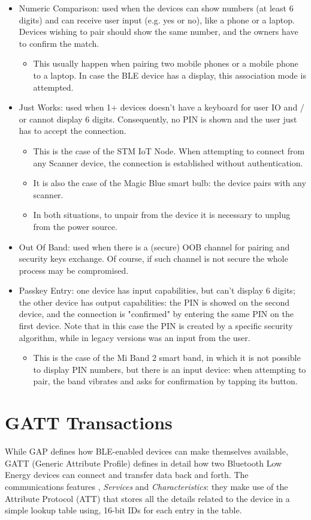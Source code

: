 \begin{itemize}
	\item Numeric Comparison: used when the devices can show numbers (at least 6 digits) and can receive user input (e.g. yes or no), like a phone or a laptop. Devices wishing to pair should show the same number, and the owners have to confirm the match.
	\begin{itemize}
		\item This usually happen when pairing two mobile phones or a mobile phone to a laptop. In case the BLE device has a display, this association mode is attempted.
	\end{itemize}
	\item Just Works: used when 1+ devices doesn't have a keyboard for user IO and / or cannot display 6 digits. Consequently, no PIN is shown and the user just has to accept the connection.
	\begin{itemize}
		\item This is the case of the STM IoT Node. When attempting to connect from any Scanner device, the connection is established without authentication.
		\item It is also the case of the Magic Blue smart bulb: the device pairs with any scanner.
		\item In both situations, to unpair from the device it is necessary to unplug from the power source.
	\end{itemize}
	\item Out Of Band: used when there is a (secure) OOB channel for pairing and security keys exchange. Of course, if such channel is not secure the whole process may be compromised.
	\item Passkey Entry: one device has input capabilities, but can't display 6 digits; the other device has output capabilities: the PIN is showed on the second device, and the connection is "confirmed" by entering the same PIN on the first device. Note that in this case the PIN is created by a specific security algorithm, while in legacy versions was an input from the user.
	\begin{itemize}
		\item This is the case of the Mi Band 2 smart band, in which it is not possible to display PIN numbers, but there is an input device: when attempting to pair, the band vibrates and asks for confirmation by tapping its button.
	\end{itemize}
\end{itemize}

\section{GATT Transactions}
While GAP defines how BLE-enabled devices can make themselves available, GATT (Generic Attribute Profile) defines in detail how two Bluetooth Low Energy devices can connect and transfer data back and forth.
The communications features , \textit{Services} and \textit{Characteristics}: they make use of the Attribute Protocol (ATT) that stores all the details related to the device in a simple lookup table using, 16-bit IDs for each entry in the table.

